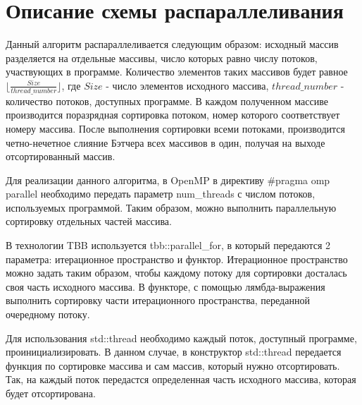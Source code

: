 \documentclass{report}
\begin{document}
\section*{Описание схемы распараллеливания}
\par Данный алгоритм распараллеливается следующим образом: исходный массив разделяется на отдельные массивы, число которых равно числу потоков, участвующих в программе. Количество элементов таких массивов будет равное $\lfloor\frac{Size}{thread\_number}\rfloor$, где $Size$ - число элементов исходного массива, $thread\_number$ - количество потоков, доступных программе. В каждом полученном массиве производится поразрядная сортировка потоком, номер которого соответствует номеру массива. После выполнения сортировки всеми потоками, производится четно-нечетное слияние Бэтчера всех массивов в один, получая на выходе отсортированный массив.
\par Для реализации данного алгоритма, в OpenMP в директиву \#pragma omp parallel необходимо передать параметр num\_threads с числом потоков, используемых программой. Таким образом, можно выполнить параллельную сортировку отдельных частей массива.
\par В технологии TBB используется tbb::parallel\_for, в который передаются 2 параметра: итерационное пространство и функтор. Итерационное пространство можно задать таким образом, чтобы каждому потоку для сортировки досталась своя часть исходного массива. В функторе, с помощью лямбда-выражения выполнить сортировку части итерационного пространства, переданной очередному потоку.
\par Для использования std::thread необходимо каждый поток, доступный программе, проинициализировать. В данном случае, в конструктор std::thread передается функция по сортировке массива и сам массив, который нужно отсортировать. Так, на каждый поток передастся определенная часть исходного массива, которая будет отсортирована.
\newpage

\end{document}
